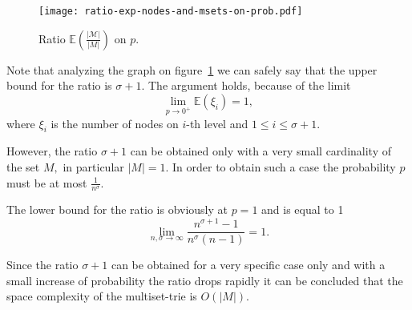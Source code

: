 \begin{figure}[h!]
\center
\texttt{[image: ratio-exp-nodes-and-msets-on-prob.pdf]}
\caption{Ratio $\mathbb{E}(\frac{|\mathcal{M}|}{|M|})$ on $p.$}
\label{f:ratio-exp-msets}
\end{figure}

Note that analyzing the graph on figure~\ref{f:ratio-exp-msets} we can safely 
say that the upper bound for the ratio is $\sigma + 1.$ The argument holds, 
because of the limit 
\begin{equation}
\lim_{p\rightarrow 0^+} \mathbb{E}(\xi_i) = 1,
\end{equation}
where $\xi_i$ is the number of nodes on $i$-th level and $1\leq i \leq \sigma + 1.$ 

However, the ratio $\sigma + 1$ can be obtained only with a very small cardinality 
of the set $M,$ in particular $|M| = 1.$ In order to obtain such a case the 
probability $p$ must be at most $\frac{1}{n^\sigma}.$

The lower bound for the ratio is obviously at $p=1$ and is equal to 1
\begin{equation}
\lim_{n,\sigma \rightarrow\infty} \frac{n^{\sigma + 1} - 1}{n^\sigma (n-1)} = 1.
\end{equation}

Since the ratio $\sigma + 1$ can be obtained for a very specific case only and 
with a small increase of probability the ratio drops rapidly it can be concluded 
that the space complexity of the multiset-trie is $O(|M|).$





